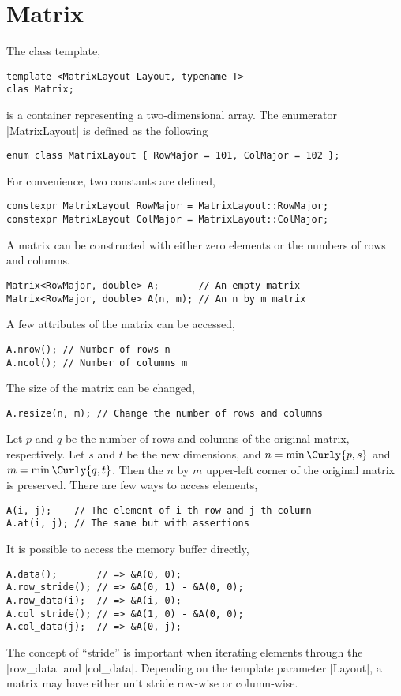 \section{Matrix}
\label{sec:Matrix}

The class template,
\begin{verbatim}
template <MatrixLayout Layout, typename T>
clas Matrix;
\end{verbatim}
is a container representing a two-dimensional array. The enumerator
|MatrixLayout| is defined as the following
\begin{verbatim}
enum class MatrixLayout { RowMajor = 101, ColMajor = 102 };
\end{verbatim}
For convenience, two constants are defined,
\begin{verbatim}
constexpr MatrixLayout RowMajor = MatrixLayout::RowMajor;
constexpr MatrixLayout ColMajor = MatrixLayout::ColMajor;
\end{verbatim}

A matrix can be constructed with either zero elements or the numbers of rows
and columns.
\begin{verbatim}
Matrix<RowMajor, double> A;       // An empty matrix
Matrix<RowMajor, double> A(n, m); // An n by m matrix
\end{verbatim}
A few attributes of the matrix can be accessed,
\begin{verbatim}
A.nrow(); // Number of rows n
A.ncol(); // Number of columns m
\end{verbatim}
The size of the matrix can be changed,
\begin{verbatim}
A.resize(n, m); // Change the number of rows and columns
\end{verbatim}
Let $p$ and $q$ be the number of rows and columns of the original matrix,
respectively. Let $s$ and $t$ be the new dimensions, and $n = \min\Curly{p, s}$
and $m = \min\Curly{q, t}$. Then the $n$ by $m$ upper-left corner of the
original matrix is preserved. There are few ways to access elements,
\begin{verbatim}
A(i, j);    // The element of i-th row and j-th column
A.at(i, j); // The same but with assertions
\end{verbatim}
It is possible to access the memory buffer directly,
\begin{verbatim}
A.data();       // => &A(0, 0);
A.row_stride(); // => &A(0, 1) - &A(0, 0);
A.row_data(i);  // => &A(i, 0);
A.col_stride(); // => &A(1, 0) - &A(0, 0);
A.col_data(j);  // => &A(0, j);
\end{verbatim}
The concept of ``stride'' is important when iterating elements through the
|row_data| and |col_data|. Depending on the template parameter |Layout|, a
matrix may have either unit stride row-wise or column-wise.


